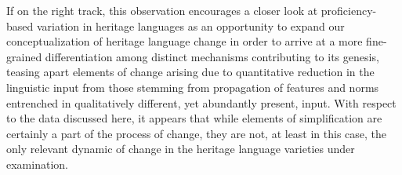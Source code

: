 \documentclass[output=paper]{langscibook}
\begin{document}
If on the right track, this observation encourages a closer look at proficiency-based variation in heritage languages as an opportunity to expand our conceptualization of heritage language change in order to arrive at a more fine-grained differentiation among distinct mechanisms contributing to its genesis, teasing apart elements of change arising due to quantitative reduction in the linguistic input from those stemming from propagation of features and norms entrenched in qualitatively different, yet abundantly present, input. With respect to the data discussed here, it appears that while elements of simplification are certainly a part of the process of change, they are not, at least in this case, the only relevant dynamic of change in the heritage language varieties under examination.

\printbibliography[heading=subbibliography,notkeyword=this]
\end{document}
